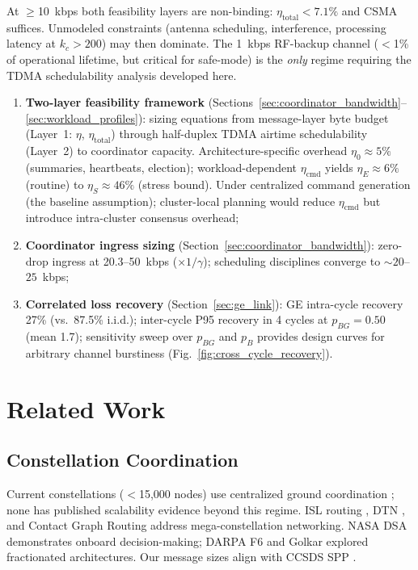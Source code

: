 \documentclass[journal]{IEEEtran}
\begin{document}
\noindent At $\geq$10~kbps both feasibility layers are non-binding: $\eta_{\text{total}} < 7.1\%$ and CSMA suffices. Unmodeled constraints (antenna scheduling, interference, processing latency at $k_c > 200$) may then dominate. The 1~kbps RF-backup channel ($<$1\% of operational lifetime, but critical for safe-mode) is the \emph{only} regime requiring the TDMA schedulability analysis developed here.
\begin{enumerate}
    \item \textbf{Two-layer feasibility framework} (Sections~\ref{sec:coordinator_bandwidth}--\ref{sec:workload_profiles}): sizing equations from message-layer byte budget (Layer~1: $\eta$, $\eta_{\text{total}}$) through half-duplex TDMA airtime schedulability (Layer~2) to coordinator capacity. Architecture-specific overhead $\eta_0 \approx 5\%$ (summaries, heartbeats, election); workload-dependent $\eta_{\text{cmd}}$ yields $\eta_E \approx 6\%$ (routine) to $\eta_S \approx 46\%$ (stress bound). Under centralized command generation (the baseline assumption); cluster-local planning would reduce $\eta_{\text{cmd}}$ but introduce intra-cluster consensus overhead;
    \item \textbf{Coordinator ingress sizing} (Section~\ref{sec:coordinator_bandwidth}): zero-drop ingress at 20.3--50~kbps ($\times 1/\gamma$); scheduling disciplines converge to ${\sim}20$--$25$~kbps;
    \item \textbf{Correlated loss recovery} (Section~\ref{sec:ge_link}): GE intra-cycle recovery 27\% (vs.\ 87.5\% i.i.d.); inter-cycle P95 recovery in 4 cycles at $p_{BG} = 0.50$ (mean 1.7); sensitivity sweep over $p_{BG}$ and $p_B$ provides design curves for arbitrary channel burstiness (Fig.~\ref{fig:cross_cycle_recovery}).
\end{enumerate}


\section{Related Work}

\subsection{Constellation Coordination}

Current constellations ($<$15{,}000 nodes) use centralized ground coordination \cite{starlink_ops, esa_conjunction, oneweb_mgmt}; none has published scalability evidence beyond this regime. ISL routing \cite{iridium_arch, handley_2018, del_portillo_mega, bhattacherjee_isl}, DTN \cite{cerf_dtn, ccsds_bpv7}, and Contact Graph Routing \cite{fraire_cgr} address mega-constellation networking. NASA DSA \cite{nasa_dsa} demonstrates onboard decision-making; DARPA F6 \cite{darpa_f6} and Golkar \cite{golkar_federated} explored fractionated architectures. Our message sizes align with CCSDS SPP \cite{ccsds_spp}.
\end{document}

